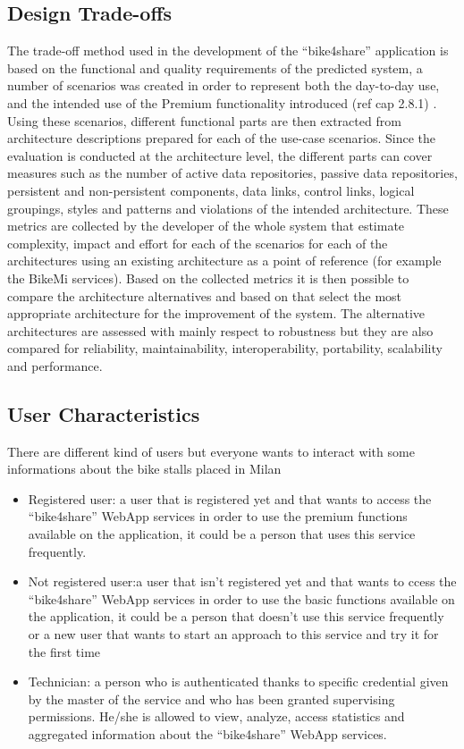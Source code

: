 \documentclass{article}
\begin{document}
\subsection{ Design Trade-offs}
The trade-off method used in the development of the “bike4share” application is based on the functional and quality requirements of the predicted system, a number of scenarios was created in order to  represent both the day-to-day use, and the intended use of the Premium  functionality introduced (ref cap 2.8.1) . 
Using these scenarios, different functional parts are then extracted from architecture descriptions prepared for each of the use-case scenarios. Since the evaluation is conducted at the architecture level, the different parts can  cover measures such as the number of active data repositories, passive data repositories, persistent and non-persistent components, data links, control links, logical groupings, styles and patterns and violations of the intended architecture. These metrics are collected by the developer of the whole system that estimate complexity, impact and effort for each of the scenarios for each of the architectures using an existing architecture as a point of reference (for example the BikeMi services). Based on the collected metrics it is then possible to compare the architecture alternatives and based on that select the most appropriate architecture for the improvement of the system. The alternative architectures are assessed with mainly respect to robustness but they are also compared for reliability, maintainability, interoperability, portability, scalability and performance.

\subsection{User Characteristics}
There are different kind of users but everyone wants to interact with some informations about the bike stalls placed in Milan
\begin{itemize}
    \item Registered user:  a user that is registered yet and that wants to access the “bike4share” WebApp services in order to use the premium functions available  on  the application, it  could  be  a  person  that  uses this service frequently.
    \item Not  registered  user:a user  that  isn’t registered  yet  and  that  wants to ccess  the  “bike4share”  WebApp  services  in  order  to  use the  basic functions available on the application, it could be a person that doesn’t use this service frequently or a new user that wants to start an approach to this service and try it for the first time 
    \item Technician:  a person who is authenticated thanks to specific credential given by the master of the service and who has been granted supervising permissions.   He/she  is  allowed  to  view,  analyze,  access  statistics  and aggregated information about the “bike4share” WebApp services.
\end{itemize}
\end{document}
